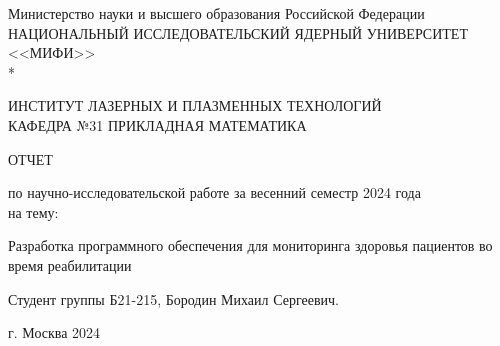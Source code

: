 \documentclass[a4paper,12pt]{article}
\begin{document}
    \renewcommand{\contentsname}{\Large Содержание}
    \renewcommand{\bibname}{\normalfont\Large\bfseries Список литературы}

    \begin{titlepage}
        \begin{center}
            Министерство науки и высшего образования Российской Федерации \\
            НАЦИОНАЛЬНЫЙ ИССЛЕДОВАТЕЛЬСКИЙ ЯДЕРНЫЙ УНИВЕРСИТЕТ <<МИФИ>> \\*
            \hrulefill
        \end{center}

        \begin{center}
            ИНСТИТУТ ЛАЗЕРНЫХ И ПЛАЗМЕННЫХ ТЕХНОЛОГИЙ\\
            КАФЕДРА №31 ПРИКЛАДНАЯ МАТЕМАТИКА
        \end{center}
        \vspace{1cm}

        \vspace{2em}

        \begin{center}
            \large{ОТЧЕТ}

            по научно-исследовательской работе
            за весенний семестр 2024 года \\

            на тему:
        \end{center}

        \begin{center}
            \large Разработка программного обеспечения для мониторинга здоровья пациентов во время реабилитации

        \end{center}

        \begin{center}
            \large Студент группы Б21-215, Бородин Михаил Сергеевич.
        \end{center}



        \vspace{25em}

        \begin{center}
            г. Москва 2024
        \end{center}
    \end{titlepage}

    \newpage
    \tableofcontents
    \setcounter{page}{3}

    \newpage
\end{document}
